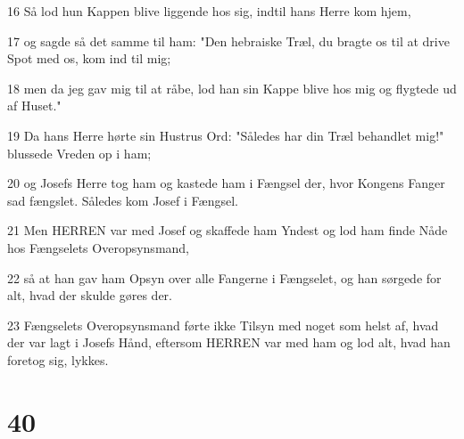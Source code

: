 \par 16 Så lod hun Kappen blive liggende hos sig, indtil hans Herre kom hjem,
\par 17 og sagde så det samme til ham: "Den hebraiske Træl, du bragte os til at drive Spot med os, kom ind til mig;
\par 18 men da jeg gav mig til at råbe, lod han sin Kappe blive hos mig og flygtede ud af Huset."
\par 19 Da hans Herre hørte sin Hustrus Ord: "Således har din Træl behandlet mig!" blussede Vreden op i ham;
\par 20 og Josefs Herre tog ham og kastede ham i Fængsel der, hvor Kongens Fanger sad fængslet. Således kom Josef i Fængsel.
\par 21 Men HERREN var med Josef og skaffede ham Yndest og lod ham finde Nåde hos Fængselets Overopsynsmand,
\par 22 så at han gav ham Opsyn over alle Fangerne i Fængselet, og han sørgede for alt, hvad der skulde gøres der.
\par 23 Fængselets Overopsynsmand førte ikke Tilsyn med noget som helst af, hvad der var lagt i Josefs Hånd, eftersom HERREN var med ham og lod alt, hvad han foretog sig, lykkes.

\chapter{40}

